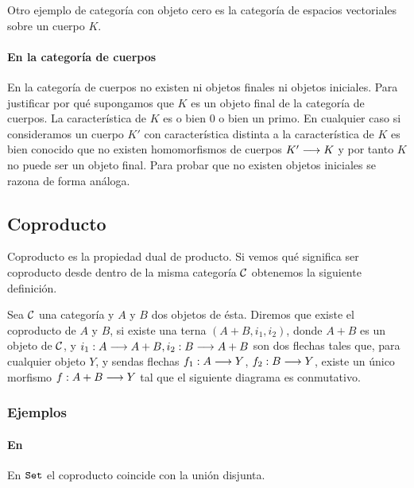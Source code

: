 Otro ejemplo de categoría con objeto cero es la categoría de espacios
vectoriales sobre un cuerpo $K$.

\paragraph{En la categoría de cuerpos}
En la categoría de cuerpos no existen ni objetos finales ni objetos
iniciales. Para justificar por qué
supongamos que $K$ es un objeto final de la categoría
de cuerpos. La característica de $K$ es o bien 0 o bien un primo.
En cualquier caso si consideramos un cuerpo $K'$ con característica
distinta a la característica de $K$ es bien conocido que no existen
homomorfismos de cuerpos $K'\longrightarrow K$ y por tanto $K$ no
puede ser un objeto final. Para probar que no existen objetos iniciales
se razona de forma análoga.

\subsection{Coproducto}
Coproducto es la propiedad dual de producto. Si vemos qué significa
ser coproducto desde dentro de la misma categoría $\mathcal{C}$ obtenemos
la siguiente definición.

\begin{definition}
Sea $\mathcal{C}$ una categoría y $A$ y $B$ dos objetos de ésta. Diremos que
existe el coproducto de $A$ y $B$,
si existe una terna $(A+B, i_1, i_2)$,
donde $A+B$ es un objeto de $\mathcal{C}$, y
$i_1 : A\longrightarrow A+B, i_2 : B\longrightarrow A+B$ son dos flechas tales
que, para cualquier objeto $Y$, y sendas flechas $f_1 : A\longrightarrow Y$,
$f_2 : B\longrightarrow Y$, existe un único morfismo
$f : A+B\longrightarrow Y$ tal que el siguiente diagrama es conmutativo.
\begin{center}
\end{center}
\end{definition}

\subsubsection{Ejemplos}
\paragraph{En \Set}
En $\texttt{Set}$ el coproducto coincide con la unión disjunta.

